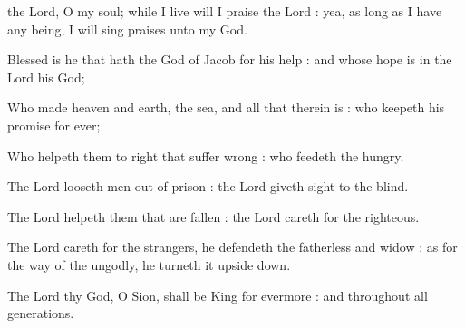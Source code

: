 
 the Lord, O my soul; while I live will I praise the Lord : yea, as long as I have any being, I will sing praises unto my God.\par
{}
Blessed is he that hath the God of Jacob for his help : and whose hope is in the Lord his God;\par
{}Who made heaven and earth, the sea, and all that therein is : who keepeth his promise for ever;\par
{}Who helpeth them to right that suffer wrong : who feedeth the hungry.\par
{}The Lord looseth men out of prison : the Lord giveth sight to the blind.\par
{}The Lord helpeth them that are fallen : the Lord careth for the righteous.\par
{}The Lord careth for the strangers, he defendeth the fatherless and widow : as for the way of the ungodly, he turneth it upside down.\par
{}The Lord thy God, O Sion, shall be King for evermore : and throughout all generations.\par



